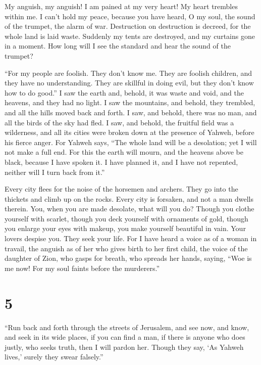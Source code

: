  My anguish, my anguish! I am pained at my very heart! My
heart trembles within me. I can't hold my peace, because you have heard,
O my soul, the sound of the trumpet, the alarm of war. 
Destruction on destruction is decreed, for the whole land is laid waste.
Suddenly my tents are destroyed, and my curtains gone in a moment.
 How long will I see the standard and hear the sound of the
trumpet?

 ``For my people are foolish. They don't know me. They are
foolish children, and they have no understanding. They are skillful in
doing evil, but they don't know how to do good.''  I saw
the earth and, behold, it was waste and void, and the heavens, and they
had no light.  I saw the mountains, and behold, they
trembled, and all the hills moved back and forth.  I saw,
and behold, there was no man, and all the birds of the sky had fled.
 I saw, and behold, the fruitful field was a wilderness,
and all its cities were broken down at the presence of Yahweh, before
his fierce anger.  For Yahweh says, ``The whole land will
be a desolation; yet I will not make a full end.  For this
the earth will mourn, and the heavens above be black, because I have
spoken it. I have planned it, and I have not repented, neither will I
turn back from it.''

 Every city flees for the noise of the horsemen and
archers. They go into the thickets and climb up on the rocks. Every city
is forsaken, and not a man dwells therein.  You, when you
are made desolate, what will you do? Though you clothe yourself with
scarlet, though you deck yourself with ornaments of gold, though you
enlarge your eyes with makeup, you make yourself beautiful in vain. Your
lovers despise you. They seek your life.  For I have heard
a voice as of a woman in travail, the anguish as of her who gives birth
to her first child, the voice of the daughter of Zion, who gasps for
breath, who spreads her hands, saying, ``Woe is me now! For my soul
faints before the murderers.''

\hypertarget{section-4}{%
\section{5}\label{section-4}}

 ``Run back and forth through the streets of Jerusalem, and
see now, and know, and seek in its wide places, if you can find a man,
if there is anyone who does justly, who seeks truth, then I will pardon
her.  Though they say, `As Yahweh lives,' surely they swear
falsely.''

